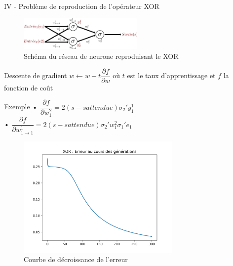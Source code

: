 \documentclass[10pt]{beamer}
\begin{document}
\begin{frame}{IV - Problème de reproduction de l'opérateur XOR}
\begin{figure}
	\centering
    \includegraphics[width=230px]{3-Model.png}
	\caption{Schéma du réseau de neurone reproduisant le XOR}
\end{figure}
\begin{block}{Descente de gradient}
$w \leftarrow w - t \dfrac{\partial f}{\partial w}$ où $t$ est le taux d'apprentissage et $f$ la fonction de coût
\end{block}
\begin{exampleblock}{Exemple}
• $\dfrac{\partial f}{\partial w^2_1} = 2(s - s{attendue})\sigma_2 'y^1_1$ \\
• $\dfrac{\partial f}{\partial w^1_{1\to 1}} = 2(s - s{attendue})\sigma_2 'w^2_1 \sigma _{1} ' e_{1}$
\end{exampleblock}

\end{frame}

\begin{frame}
\begin{figure}
	\centering
    \includegraphics[width=300px]{4-XOR.png}
	\caption{Courbe de décroissance de l'erreur}
\end{figure}
\end{frame}
\end{document}
